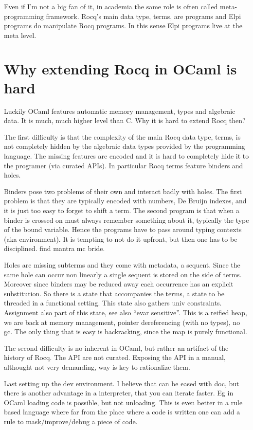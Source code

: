 \documentclass[a4paper, 11pt]{book}
\begin{document}
Even if I'm not a big fan of it, in academia the same role is often called
meta-programming framework. Rocq's main data type, terms, are programs and Elpi
programs do manipulate Rocq programs. In this sense Elpi programs live at the
meta level.

\section{Why extending Rocq in OCaml is hard}

Luckily OCaml features automatic memory management, types and algebraic data.
It is much, much higher level than C. Why it is hard to extend Rocq then?

The first difficulty is that the complexity of the main Rocq data type, terms,
is not completely hidden by the algebraic data types provided by the programming
language. The missing features are encoded and it is hard to completely hide
it to the programer (via curated APIs). In particular Rocq terms feature binders
and holes. 

Binders pose two problems of their own and interact badly with holes.
The first problem is that they are typically encoded with numbers, De Bruijn
indexes, and it is just too easy to forget to shift a term.  The second program
is that when a binder is crossed on must always remember something about it,
typically the type of the bound variable. Hence the programs have to pass around
typing contexts (aka environment). It is tempting to not do it upfront, but
then one has to be disciplined. find mantra mc bride.

Holes are missing subterms and they come with metadata, a sequent.
Since the same hole can occur non linearly a single sequent is stored on the side of terms.
Moreover since binders may be reduced away each occurrence has an explicit
substitution. So there is a state that accompanies the terms, a state to be
threaded in a functional setting. This state also gathers univ constraints.
Assignment also part of this state, see also ``evar sensitive''. This is
a reified heap, we are back at memory management, pointer dereferencing (with no
types), no gc. The only thing that is easy is backracking, since the map is
purely functional.

The second difficulty is no inherent in OCaml, but rather an artifact of the
history of Rocq. The API are not curated. Exposing the API in a manual, althought
not very demanding, way is key to rationalize them.


Last setting up the dev environment. I believe that can be eased with doc, but
there is another advantage in a interpreter, that you can iterate faster. Eg
in OCaml loading code is possible, but not unloading. This is even better in
a rule based language where far from the place where a code is written one
can add a rule to mask/improve/debug a piece of code.
\end{document}
